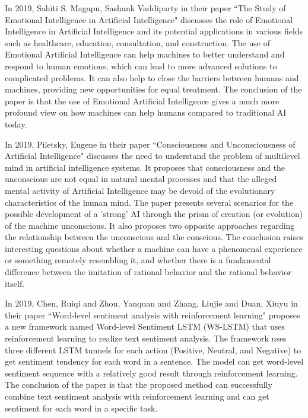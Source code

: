 In 2019, Sahiti S. Magapu, Sashank Vaddiparty in their paper ``The Study of Emotional Intelligence in
Artificial Intelligence" discusses the role of Emotional Intelligence in Artificial Intelligence and its potential applications in various fields such as healthcare, education, consultation, and construction. The use of Emotional Artificial Intelligence can help machines to better understand and respond to human emotions, which can lead to more advanced solutions to complicated problems. It can also help to close the barriers between humans and machines, providing new opportunities for equal treatment. The conclusion of the paper is that the use of Emotional Artificial Intelligence gives a much more profound view on how machines can help humans compared to traditional AI today\cite{ISSN-2456-2165}.
\vspace{1\baselineskip}

In 2019, Piletsky, Eugene in their paper ``Consciousness and Unconsciousness of Artificial Intelligence" discusses the need to understand the problem of multilevel mind in artificial intelligence systems. It proposes that consciousness and the unconscious are not equal in natural mental processes and that the alleged mental activity of Artificial Intelligence may be devoid of the evolutionary characteristics of the human mind. The paper presents several scenarios for the possible development of a 'strong' AI through the prism of creation (or evolution) of the machine unconscious. It also proposes two opposite approaches regarding the relationship between the unconscious and the conscious. The conclusion raises interesting questions about whether a machine can have a phenomenal experience or something remotely resembling it, and whether there is a fundamental difference between the imitation of rational behavior and the rational behavior itself\cite{article4}.
\vspace{1\baselineskip}

In 2019, Chen, Ruiqi and Zhou, Yanquan and Zhang, Liujie and Duan, Xiuyu in their paper ``Word-level sentiment analysis with reinforcement learning" proposes a new framework named Word-level Sentiment LSTM (WS-LSTM) that uses reinforcement learning to realize text sentiment analysis. The framework uses three different LSTM tunnels for each action (Positive, Neutral, and Negative) to get sentiment tendency for each word in a sentence. The model can get word-level sentiment sequence with a relatively good result through reinforcement learning. The conclusion of the paper is that the proposed method can successfully combine text sentiment analysis with reinforcement learning and can get sentiment for each word in a specific task\cite{article5}.
\vspace{1\baselineskip}

